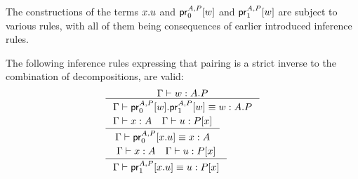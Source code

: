 The constructions of the terms $\ctxext{x}{u}$ and $\cprojfst{A}{P}{w}$ and
$\cprojsnd{A}{P}{w}$ are subject to various rules, with all of them being
consequences of earlier introduced inference rules.

\begin{lem} The following inference rules expressing that pairing is a strict
inverse to the combination of decompositions, are valid:
\begin{align*}
& \inference{\jterm{\Gamma}{\ctxext{A}{P}}{w}}{\jtermeq{\Gamma}{\ctxext{A}{P}}{\ctxext{\cprojfst{A}{P}{w}}{\cprojsnd{A}{P}{w}}}{w}}\\
& \inference{\jterm{\Gamma}{A}{x}\quad\jterm{\Gamma}{\subst{x}{P}}{u}}{\jtermeq{\Gamma}{A}{\cprojfst{A}{P}{\ctxext{x}{u}}}{x}}\\
& \inference{\jterm{\Gamma}{A}{x}\quad\jterm{\Gamma}{\subst{x}{P}}{u}}{\jtermeq{\Gamma}{\subst{x}{P}}{\cprojsnd{A}{P}{\ctxext{x}{u}}}{u}}
\end{align*}
\end{lem}

